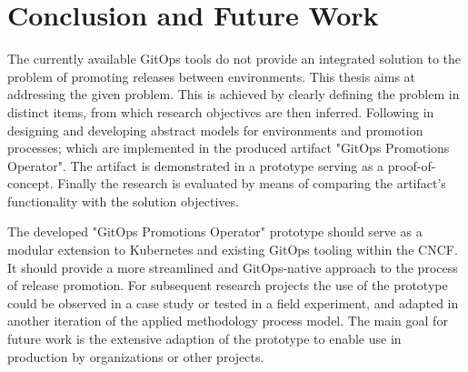 \chapter{Conclusion and Future Work}

%
%
%
%

\noindent
The currently available GitOps tools
do not provide an integrated solution to
the problem of promoting releases between environments.
This thesis aims at addressing the given problem.
This is achieved by
clearly defining the problem in distinct items,
from which research objectives are then inferred.
Following in designing and developing abstract models for
environments and promotion processes;
which are implemented in the produced artifact "GitOps Promotions Operator".
The artifact is demonstrated in a prototype serving as a proof-of-concept.
Finally the research is evaluated by means of
comparing the artifact's functionality with the solution objectives.
\bigskip

\noindent
The developed "GitOps Promotions Operator" prototype should serve as
a modular extension to Kubernetes and existing GitOps tooling within the CNCF.
It should provide a more streamlined and GitOps-native approach
to the process of release promotion.
For subsequent research projects the use of the prototype could
be observed in a case study or tested in a field experiment,
and adapted in another iteration of the applied methodology process model.
The main goal for future work is the extensive adaption of the prototype
to enable use in production by organizations or other projects.





















